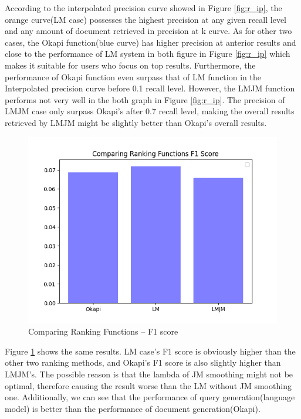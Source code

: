 \documentclass[10pt, a4paper]{article}
\begin{document}
According to the interpolated precision curve showed in Figure \ref{fig:r_ip}, the orange curve(LM case) possesses the highest precision at any given recall level and any amount of document retrieved in precision at k curve. As for other two cases, the Okapi function(blue curve) has higher precision at anterior results and close to the performance of LM system in both figure in Figure \ref{fig:r_ip} which makes it suitable for users who focus on top results. Furthermore, the performance of Okapi function even surpass that of LM function in the Interpolated precision curve before 0.1 recall level. However, the LMJM function performs not very well in the both graph in Figure \ref{fig:r_ip}. The precision of LMJM case only surpass Okapi's after 0.7 recall level,  making the overall results retrieved by LMJM might be slightly better than Okapi's overall results.


\begin{figure}[h!]
\centering
\includegraphics[scale=0.5]{compare ranking/Comparing Ranking Functions F1 Score.png}
\caption{Comparing Ranking Functions -- F1 score}
\label{fig:r_f}
\end{figure}

Figure \ref{fig:r_f} shows the same results. LM case's F1 score is obviously higher than the other two ranking methods, and Okapi's F1 score is also slightly higher than LMJM's. The possible reason is that the lambda of JM smoothing might not be optimal, therefore causing the result worse than the LM without JM smoothing one. Additionally, we can see that the performance of query generation(language model) is better than the performance of document generation(Okapi).
\end{document}
